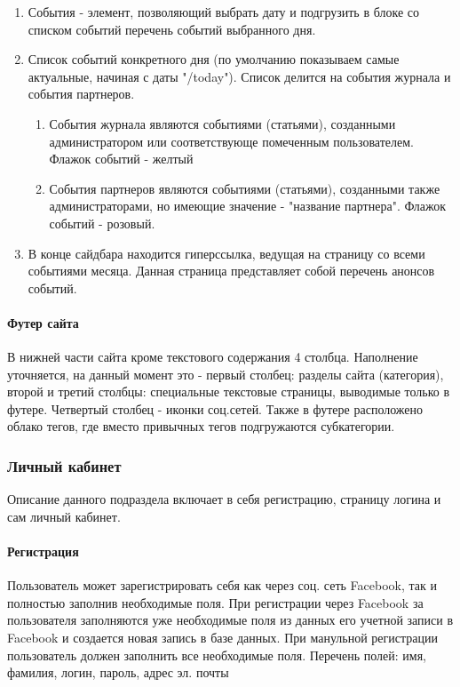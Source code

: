 \documentclass[DIV=calc, paper=a4, fontsize=11pt]{scrartcl} %
\begin{document}
\begin{enumerate}
\begin{enumerate}
        \end{enumerate}
    \item События - элемент, позволяющий выбрать дату и подгрузить в блоке со списком событий перечень событий выбранного дня.
    \item Список событий конкретного дня (по умолчанию показываем самые актуальные, начиная с даты "/today"). Список делится на события журнала и события партнеров.
        \begin{enumerate}
            \item События журнала являются событиями (статьями), созданными администратором или соответствующе помеченным пользователем. Флажок событий - желтый
            \item События партнеров являются событиями (статьями), созданными также администраторами, но имеющие значение - "название партнера". Флажок событий - розовый.
        \end{enumerate}
    \item В конце сайдбара находится гиперссылка, ведущая на страницу со всеми событиями месяца. Данная страница представляет собой перечень анонсов событий.
\end{enumerate}

\paragraph{Футер сайта}
В нижней части сайта кроме текстового содержания 4 столбца. Наполнение уточняется, на данный момент это - первый столбец: разделы сайта (категория), второй и третий столбцы: специальные текстовые страницы, выводимые только в футере. Четвертый столбец - иконки соц.сетей. Также в футере расположено облако тегов, где вместо привычных тегов подгружаются субкатегории.

\subsubsection{Личный кабинет}
Описание данного подраздела включает в себя регистрацию, страницу логина и сам личный кабинет.

\paragraph{Регистрация}
Пользователь может зарегистрировать себя как через соц. сеть Facebook, так и полностью заполнив необходимые поля. 
При регистрации через Facebook за пользователя заполняются уже необходимые поля из данных его учетной записи в Facebook и создается новая запись в базе данных. При манульной регистрации пользователь должен заполнить все необходимые поля.
Перечень полей: имя, фамилия, логин, пароль, адрес эл. почты
\end{document}
